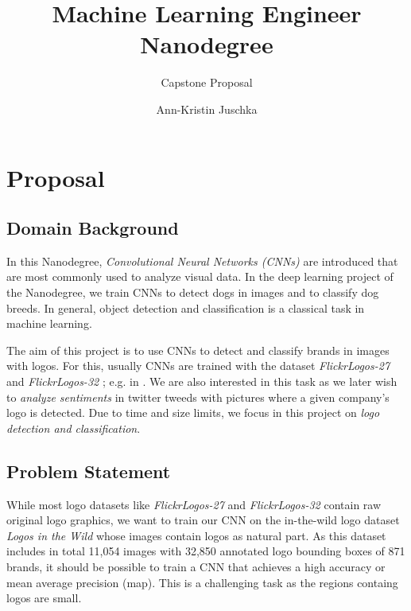 \documentclass{scrartcl}
\begin{document}
\title{Machine Learning Engineer Nanodegree}
\author{Ann-Kristin Juschka}
\subtitle{Capstone Proposal}
\maketitle




\section*{Proposal}
\subsection*{Domain Background}


In this Nanodegree, \emph{Convolutional Neural Networks (CNNs)} are introduced that are most commonly used to analyze visual data.
In the deep learning project of the Nanodegree, we train CNNs to detect dogs in images and to classify dog breeds.
In general, object detection and classification is a classical task in machine learning. 

The aim of this project is to use CNNs to detect and classify brands in images with logos. For this, usually CNNs are trained with the dataset \emph{FlickrLogos-27} \cite{flickrlogos27} and \emph{FlickrLogos-32} \cite{flickrlogos32}; e.g. in \cite{BIANCO201723,DBLP:journals/corr/IandolaSGK15}. We are also interested in this task as we later wish to \emph{analyze sentiments} in twitter tweeds with pictures where a given company's logo is detected.
Due to time and size limits, we focus in this project on \emph{logo detection and classification}.



\subsection*{Problem Statement}

While most logo datasets like \emph{FlickrLogos-27} \cite{flickrlogos27} and \emph{FlickrLogos-32} \cite{flickrlogos32} contain raw original logo graphics, we want to train our CNN on the in-the-wild logo dataset \emph{Logos in the Wild} \cite{logosinthewild} whose images contain logos as natural part. As this dataset includes in total 11,054 images with 32,850 annotated logo bounding boxes of 871 brands, it should be possible to train a CNN that achieves a high  accuracy or mean average precision (map).
This is a challenging task as the regions containg logos are small.
\end{document}
